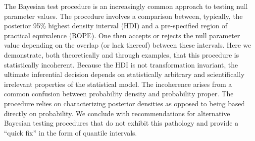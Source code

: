The Bayesian \hdr{} test procedure is an increasingly common approach to testing null parameter values.
The procedure involves a comparison between, typically, the posterior 95\% highest density interval (HDI) and a pre-specified region of practical equivalence (ROPE). One then accepts or rejects the null parameter value depending on the overlap (or lack thereof) between these intervals.
Here we demonstrate, both theoretically and through examples, that this procedure is statistically incoherent.
%
Because the HDI is not transformation invariant, the ultimate inferential decision depends on statistically arbitrary and scientifically irrelevant properties of the statistical model.
The incoherence arises from a common confusion between probability density and probability proper.  The \hdr{} procedure relies on characterizing posterior densities as opposed to being based directly on probability. 
We conclude with recommendations for alternative Bayesian testing procedures that do not exhibit this pathology and provide a ``quick fix'' in the form of quantile intervals.